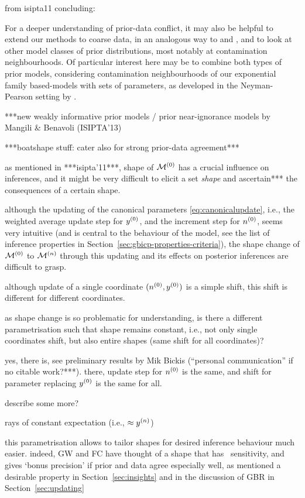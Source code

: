 from isipta11 concluding:
\begin{small}
For a deeper understanding of prior-data conflict, it may also be helpful
to extend our methods to coarse data, in an analogous way to \textcite{2007:utkinaugustin} and
\textcite{2009:Troffaes:Coolen}, and to look at other model classes of prior distributions, most
notably at contamination neighbourhoods. Of particular interest here may
be to combine both types of prior models, considering contamination
neighbourhoods of our exponential family based-models with sets of
parameters, as developed in the Neyman-Pearson setting by
\textcite[\S~5]{2002:augustin}.
\end{small}

***new weakly informative prior models / prior near-ignorance models by Mangili \& Benavoli (ISIPTA'13)


***boatshape stuff: cater also for strong prior-data agreement***

as mentioned in ***isipta'11***, shape of $\mathcal{M}^{(0)}$ has a crucial influence on inferences,
and it might be very difficult to elicit a set \emph{shape} and ascertain*** the consequences of a certain shape.

although the updating of the canonical parameters \eqref{eq:canonicalupdate},
i.e., the weighted average update step for $y^{(0)}$, and the increment step for $n^{(0)}$,
seems very intuitive (and is central to the behaviour of the model,
see the list of inference properties in Section~\ref{sec:gbicp-properties-criteria}),
the shape change of $\mathcal{M}^{(0)}$ to $\mathcal{M}^{(n)}$ through this updating and its effects on posterior inferences are difficult to grasp.

although update of a single coordinate $(n^{(0)},y^{(0)})$ is a simple shift,
this shift is different for different coordinates.

as shape change is so problematic for understanding,
is there a different parametrisation such that shape remains constant,
i.e., not only single coordinates shift, but also entire shapes
(same shift for all coordinates)?

yes, there is, see preliminary results by Mik Bickis (``personal communication'' if no citable work?***).
there, update step for $n^{(0)}$ is the same, and shift for parameter replacing $y^{(0)}$ is the same for all. 

describe some more?

rays of constant expectation (i.e., $\approx y^{(n)}$)

this parametrisation allows to tailor shapes for desired inference behaviour much easier.
indeed, GW and FC have thought of a shape that has \pdc\ sensitivity,
and gives `bonus precision' if prior and data agree especially well,
as mentioned a desirable property in Section~\ref{sec:insights}
and in the discussion of GBR in Section~\ref{sec:updating}

